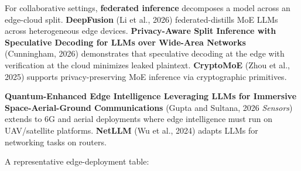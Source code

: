 For collaborative settings, \textbf{federated inference} decomposes a model across an edge-cloud split. \textbf{DeepFusion} (Li et al., 2026) federated-distills MoE LLMs across heterogeneous edge devices. \textbf{Privacy-Aware Split Inference with Speculative Decoding for LLMs over Wide-Area Networks} (Cunningham, 2026) demonstrates that speculative decoding at the edge with verification at the cloud minimizes leaked plaintext. \textbf{CryptoMoE} (Zhou et al., 2025) supports privacy-preserving MoE inference via cryptographic primitives.

\textbf{Quantum-Enhanced Edge Intelligence Leveraging LLMs for Immersive Space-Aerial-Ground Communications} (Gupta and Sultana, 2026 \emph{Sensors}) extends to 6G and aerial deployments where edge intelligence must run on UAV/satellite platforms. \textbf{NetLLM} (Wu et al., 2024) adapts LLMs for networking tasks on routers.

A representative edge-deployment table:

